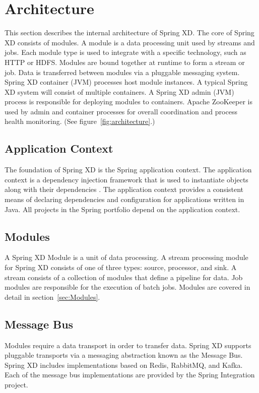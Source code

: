 \section{Architecture}
This section describes the internal architecture of Spring XD. The core of
Spring XD consists of modules. A module is a data processing unit used by
streams and jobs. Each module type is used to integrate with a specific
technology, such as HTTP or HDFS. Modules are bound together at runtime
to form a stream or job. Data is transferred between modules via a pluggable
messaging system. Spring XD container (JVM)\cite{jvm} processes host module instances.
A typical Spring XD system will consist of multiple containers. A Spring XD
admin (JVM) process is responsible for deploying modules to containers.
Apache ZooKeeper\cite{zookeeper} is used by admin and container processes
for overall coordination and process health monitoring. 
(See figure~\ref{fig:architecture}.)

\subsection{Application Context}
The foundation of Spring XD is the Spring application context. The application
context is a dependency injection framework that is used to instantiate
objects along with their dependencies \cite{spring-framework-reference}.
The application context provides a consistent means of declaring dependencies
and configuration for applications written in Java. All projects in the
Spring\cite{spring} portfolio depend on the application context.

\subsection{Modules}
A Spring XD Module is a unit of data processing. A stream processing module
for Spring XD consists of one of three types: source, processor, and sink.
A stream consists of a collection of modules that define a pipeline for data.
Job modules are responsible for the execution of batch jobs. Modules are
covered in detail in section~\ref{sec:Modules}.

\subsection{Message Bus}
\label{subsec:MessageBus}
Modules require a data transport in order to transfer data. Spring XD
supports pluggable transports via a messaging abstraction known as 
the Message Bus. Spring XD includes implementations based on Redis\cite{redis}, 
RabbitMQ\cite{rabbitmq}, and Kafka. Each of the message bus implementations are provided 
by the Spring Integration project.


